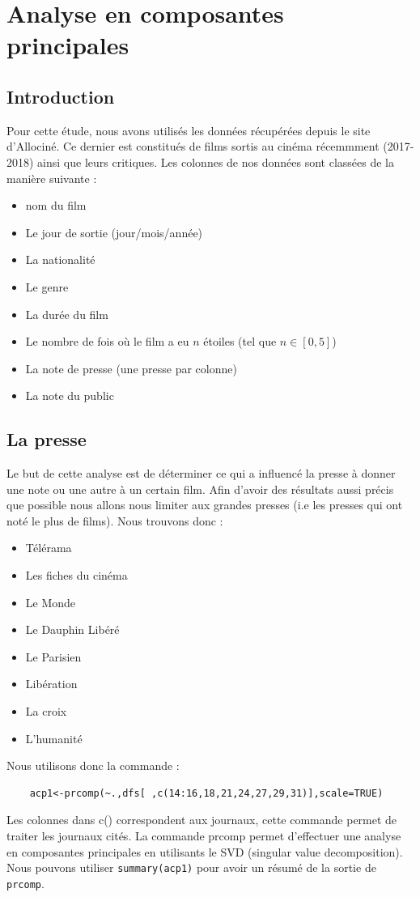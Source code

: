 \documentclass{report}
\begin{document}
\section{Analyse en composantes principales}
\subsection{Introduction}
Pour cette étude, nous avons utilisés les données récupérées depuis le site
d’Allociné. Ce dernier est constitués de films sortis au cinéma récemmment (2017-2018) ainsi que leurs critiques.
Les colonnes de nos données sont classées de la manière suivante :
\begin{itemize}
  \item nom du film
  \item Le jour de sortie (jour/mois/année)
  \item La nationalité
  \item Le genre
  \item La durée du film
  \item Le nombre de fois où le film a eu $n$ étoiles (tel que $n \in [0,5]$)
  \item La note de presse (une presse par colonne)
  \item La note du public
\end{itemize}
\subsection{La presse}
Le but de cette analyse est de déterminer ce qui a influencé la presse à donner une note ou une autre à un
certain film. Afin d'avoir des résultats aussi précis que possible nous allons nous limiter aux grandes presses
(i.e les presses qui ont noté le plus de films). Nous trouvons donc :
\begin{itemize}
  \item Télérama
  \item Les fiches du cinéma
  \item Le Monde
  \item Le Dauphin Libéré
  \item Le Parisien
  \item Libération
  \item La croix
  \item L'humanité
\end{itemize}
Nous utilisons donc la commande :
\begin{verbatim}
    acp1<-prcomp(~.,dfs[ ,c(14:16,18,21,24,27,29,31)],scale=TRUE)
\end{verbatim}
Les colonnes dans c() correspondent aux journaux, cette commande permet de traiter les journaux cités.
La commande prcomp permet d'effectuer une analyse en composantes principales en utilisants le SVD (singular value
decomposition).\\
Nous pouvons utiliser \texttt{summary(acp1)} pour avoir un résumé de la sortie de \texttt{prcomp}.\\
\end{document}
